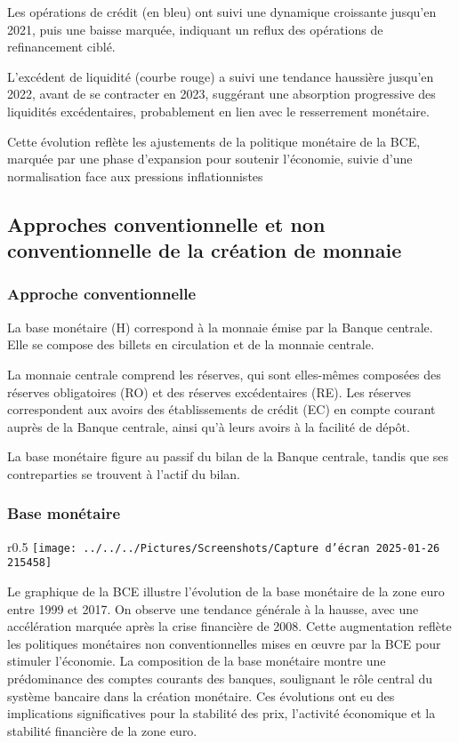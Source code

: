 \documentclass[a4paper, 12pt]{report}
\begin{document}
Les opérations de crédit (en bleu) ont suivi une dynamique croissante jusqu'en 2021, puis une baisse marquée, indiquant un reflux des opérations de refinancement ciblé.  

L'excédent de liquidité (courbe rouge) a suivi une tendance haussière jusqu'en 2022, avant de se contracter en 2023, suggérant une absorption progressive des liquidités excédentaires, probablement en lien avec le resserrement monétaire.  

Cette évolution reflète les ajustements de la politique monétaire de la BCE, marquée par une phase d'expansion pour soutenir l'économie, suivie d'une normalisation face aux pressions inflationnistes

\subsection{Approches conventionnelle et non conventionnelle de la création de monnaie}
	
\subsubsection{Approche conventionnelle}



La base monétaire (H) correspond à la monnaie émise par la Banque centrale. Elle se compose des billets en circulation et de la monnaie centrale.

La monnaie centrale comprend les réserves, qui sont elles-mêmes composées des réserves obligatoires (RO) et des réserves excédentaires (RE). Les réserves correspondent aux avoirs des établissements de crédit (EC) en compte courant auprès de la Banque centrale, ainsi qu'à leurs avoirs à la facilité de dépôt.

La base monétaire figure au passif du bilan de la Banque centrale, tandis que ses contreparties se trouvent à l'actif du bilan.
	
\subsubsection{Base monétaire}
	
\begin{wrapfigure}{r}{0.5\textwidth}
	\centering
\texttt{[image: ../../../Pictures/Screenshots/Capture d'écran 2025-01-26 215458]}
\end{wrapfigure}

Le graphique de la BCE illustre l'évolution de la base monétaire de la zone euro entre 1999 et 2017. On observe une tendance générale à la hausse, avec une accélération marquée après la crise financière de 2008. Cette augmentation reflète les politiques monétaires non conventionnelles mises en œuvre par la BCE pour stimuler l'économie. La composition de la base monétaire montre une prédominance des comptes courants des banques, soulignant le rôle central du système bancaire dans la création monétaire. Ces évolutions ont eu des implications significatives pour la stabilité des prix, l'activité économique et la stabilité financière de la zone euro.
\end{document}
